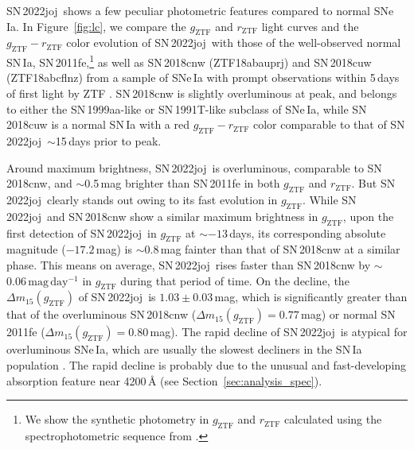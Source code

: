 \documentclass[twocolumn]{aastex631}
\newcommand{\sn}{SN\,2022joj}
\begin{document}
\begin{CJK*}{UTF8}{gbsn}
\sn\ shows a few peculiar photometric features compared to normal SNe\,Ia. In Figure~\ref{fig:lc}, we compare the $g_\mathrm{ZTF}$ and $r_\mathrm{ZTF}$ light curves and the $g_\mathrm{ZTF} - r_\mathrm{ZTF}$ color evolution of \sn\ with those of the well-observed normal SN\,Ia, SN\,2011fe,\footnote{We show the synthetic photometry in $g_\mathrm{ZTF}$ and $r_\mathrm{ZTF}$ calculated using the spectrophotometric sequence from \citet{Pereira_2013}.} as well as SN\,2018cnw (ZTF18abauprj) and SN\,2018cuw (ZTF18abcflnz) from a sample of SNe\,Ia with prompt observations within 5\,days of first light by ZTF \citep{Yao_2019,Bulla2020}. 
SN\,2018cnw is slightly overluminous at peak, and belongs to either the SN\,1999aa-like \citep[99aa-like;][]{Garavini_99aa_2004} or SN\,1991T-like \citep[91T-like;][]{Filippenko_91T_1992} subclass of SNe\,Ia, while SN\,2018cuw is a normal SN\,Ia with a red $g_\mathrm{ZTF} - r_\mathrm{ZTF}$ color comparable to that of \sn\ $\sim$15\,days prior to peak. 

Around maximum brightness, \sn\ is overluminous, comparable to SN\,2018cnw, and $\sim$0.5\,mag brighter than SN\,2011fe in both $g_\mathrm{ZTF}$ and $r_\mathrm{ZTF}$. But \sn\ clearly stands out owing to its fast evolution in $g_\mathrm{ZTF}$. While \sn\ and SN\,2018cnw show a similar maximum brightness in $g_\mathrm{ZTF}$, upon the first detection of \sn\ in $g_\mathrm{ZTF}$ at $\sim$$-13$\,days, its corresponding absolute magnitude ($-17.2$\,mag) is $\sim$0.8\,mag fainter than that of SN\,2018cnw at a similar phase. This means on average, \sn\ rises faster than SN\,2018cnw by $\sim$$0.06\,\mathrm{mag\,day^{-1}}$ in $g_\mathrm{ZTF}$ during that period of time. On the decline, the $\Delta m_{15}(g_\mathrm{ZTF})$ of \sn\ is $1.03\pm0.03$\,mag, which is significantly greater than that of the overluminous SN\,2018cnw ($\Delta m_{15}(g_\mathrm{ZTF})=0.77$\,mag) or normal SN\,2011fe ($\Delta m_{15}(g_\mathrm{ZTF})=0.80$\,mag). The rapid decline of \sn\ is atypical for overluminous SNe\,Ia, which are usually the slowest decliners in the SN\,Ia population \citep{Phillips_1999, Taubenberger_2017}. The rapid decline is probably due to the unusual and fast-developing absorption feature near 4200\,\r{A} (see Section~\ref{sec:analysis_spec}).


\end{CJK*}
\end{document}
